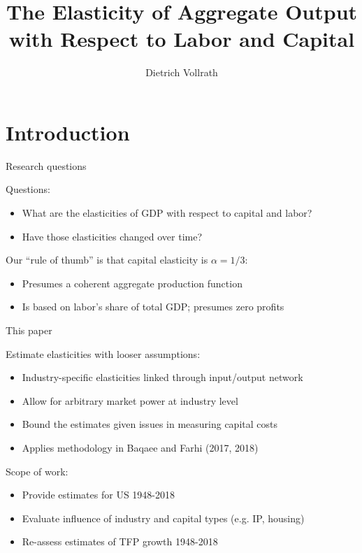 \documentclass[10pt,xcolor=dvipsnames]{beamer}
\title[Aggregate elasticities]{The Elasticity of Aggregate Output with Respect to Labor and Capital}
\author[Vollrath]{Dietrich Vollrath \inst{1}}
\institute[UH]{\inst{1} University of Houston}
\date[January 2024]{}
\begin{document}
\maketitle

\section{Introduction}

\begin{frame}{Research questions}\label{define}

Questions:
\begin{itemize}
  \item What are the elasticities of GDP with respect to capital and labor?
  \item Have those elasticities changed over time?
\end{itemize}

\pause
\vspace{.25in}
Our ``rule of thumb'' is that capital elasticity is $\alpha = 1/3$:
\begin{itemize}
  \item Presumes a coherent aggregate production function
  \item Is based on labor's share of total GDP; presumes zero profits
\end{itemize}

\end{frame}

\begin{frame}{This paper}

Estimate elasticities with looser assumptions:
\begin{itemize}
  \item Industry-specific elasticities linked through input/output network
  \item Allow for arbitrary market power at industry level
  \item Bound the estimates given issues in measuring capital costs
  \item Applies methodology in Baqaee and Farhi (2017, 2018)
\end{itemize}

\pause
\vspace{.25in}
Scope of work:
\begin{itemize}
  \item Provide estimates for US 1948-2018
  \item Evaluate influence of industry and capital types (e.g. IP, housing)
  \item Re-assess estimates of TFP growth 1948-2018
\end{itemize}

\end{frame}
\end{document}
